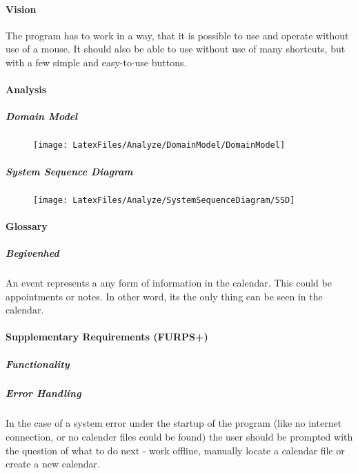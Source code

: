 \documentclass{article}
\begin{document}
  \paragraph{Vision} \mbox{} 
  
  The program has to work in a way, that it is possible to use and operate without use of a mouse. It should also be able to use without use of many shortcuts, but with a few simple and easy-to-use buttons. 
  
  	\paragraph{Analysis} \mbox{}
  	
	
	\newpage
	\subparagraph{Domain Model} \mbox{}
	
	\begin{figure}[h]
	\caption{}
	\hspace{-50pt}   
   	\texttt{[image: LatexFiles/Analyze/DomainModel/DomainModel]}
   	\end{figure}
	
\newpage
	\subparagraph{System Sequence Diagram} \mbox{}

	\begin{figure}[h]
	\caption{}   
   	\hspace{-50pt}
   	\texttt{[image: LatexFiles/Analyze/SystemSequenceDiagram/SSD]}
   	\end{figure}
\newpage
	   \mbox{}
	\newpage
   \paragraph{Glossary} \mbox{}
\subparagraph{Begivenhed} \mbox{}

An event represents a any form of information in the calendar. This could be appointments or notes. In other word, its the only thing can be seen in the calendar. \\
   
   \paragraph{Supplementary Requirements (FURPS+)} \mbox{}
   \subparagraph{Functionality} \mbox{}
   
   \subparagraph{Error Handling} \mbox{}
   
   In the case of a system error under the startup of the program (like no internet connection, or no calender files could be found) the user should be prompted with the question of what to do next - work offline, manually locate a calendar file or create a new calendar. \linebreak
   
\end{document}
